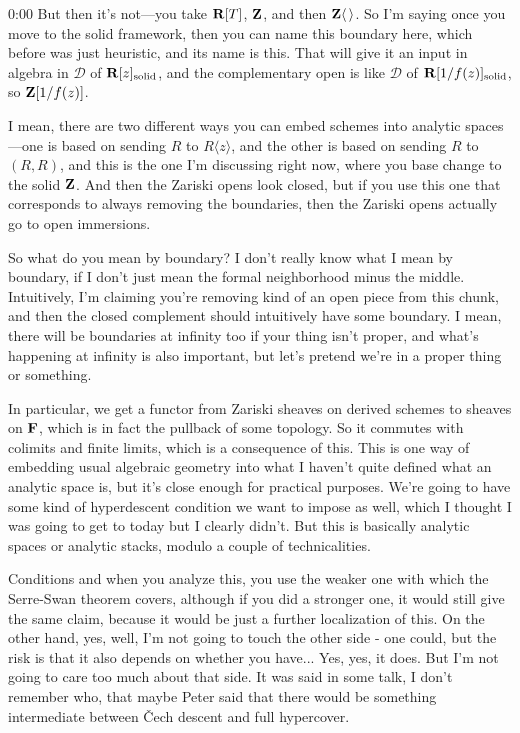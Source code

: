 \begin{unfinished}{0:00}
But then it's not---you take $\mathbf R[T]$, $\mathbf Z$, and then $\mathbf Z\langle\,\rangle$. So I'm saying once you move to the solid framework, then you can name this boundary here, which before was just heuristic, and its name is this. That will give it an input in algebra in $\mathcal{D}$ of $\mathbf R[z]_{\text{solid}}$, and the complementary open is like $\mathcal{D}$ of $\mathbf R[1/f(z)]_{\text{solid}}$, so $\mathbf Z[1/f(z)]$.

I mean, there are two different ways you can embed schemes into analytic spaces---one is based on sending $R$ to $R\langle z\rangle$, and the other is based on sending $R$ to $(R, R)$, and this is the one I'm discussing right now, where you base change to the solid $\mathbf Z$. And then the Zariski opens look closed, but if you use this one that corresponds to always removing the boundaries, then the Zariski opens actually go to open immersions.

So what do you mean by boundary? I don't really know what I mean by boundary, if I don't just mean the formal neighborhood minus the middle. Intuitively, I'm claiming you're removing kind of an open piece from this chunk, and then the closed complement should intuitively have some boundary. I mean, there will be boundaries at infinity too if your thing isn't proper, and what's happening at infinity is also important, but let's pretend we're in a proper thing or something.

In particular, we get a functor from Zariski sheaves on derived schemes to sheaves on $\mathbf F$, which is in fact the pullback of some topology. So it commutes with colimits and finite limits, which is a consequence of this. This is one way of embedding usual algebraic geometry into what I haven't quite defined what an analytic space is, but it's close enough for practical purposes. We're going to have some kind of hyperdescent condition we want to impose as well, which I thought I was going to get to today but I clearly didn't. But this is basically analytic spaces or analytic stacks, modulo a couple of technicalities.

Conditions and when you analyze this, you use the weaker one with which the Serre-Swan theorem covers, although if you did a stronger one, it would still give the same claim, because it would be just a further localization of this. On the other hand, yes, well, I'm not going to touch the other side - one could, but the risk is that it also depends on whether you have... Yes, yes, it does. But I'm not going to care too much about that side. It was said in some talk, I don't remember who, that maybe Peter said that there would be something intermediate between Čech descent and full hypercover.


\end{unfinished}
